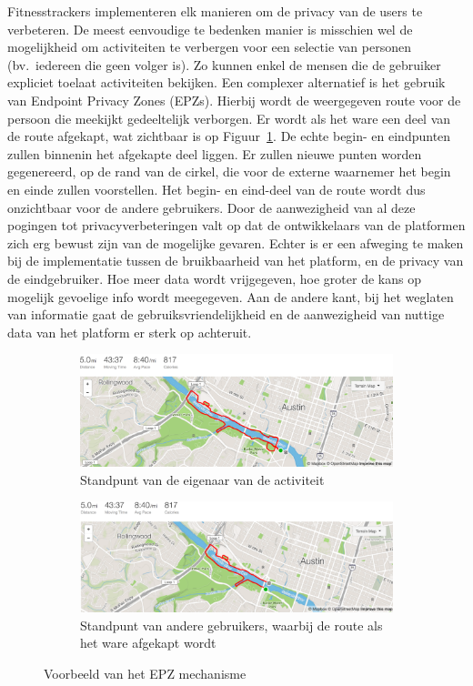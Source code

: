 Fitnesstrackers implementeren elk manieren om de privacy van de users te
verbeteren. De meest eenvoudige te bedenken manier is misschien wel de
mogelijkheid om activiteiten te verbergen voor een selectie van personen (bv.\
iedereen die geen volger is). Zo kunnen enkel de mensen die de gebruiker
expliciet toelaat activiteiten bekijken. Een complexer alternatief is het
gebruik van Endpoint Privacy Zones (\acp{EPZ}). Hierbij wordt de weergegeven
route voor de persoon die meekijkt gedeeltelijk verborgen. Er wordt als het
ware een deel van de route afgekapt, wat zichtbaar is op
Figuur~\ref{fig:example_hassan}. De echte begin- en eindpunten zullen binnenin
het afgekapte deel liggen. Er zullen nieuwe punten worden gegenereerd, op de
rand van de cirkel, die voor de externe waarnemer het begin en einde zullen
voorstellen. Het begin- en eind-deel van de route wordt dus onzichtbaar voor de
andere gebruikers. Door de aanwezigheid van al deze pogingen tot
privacyverbeteringen valt op dat de ontwikkelaars van de platformen zich erg
bewust zijn van de mogelijke gevaren. Echter is er een afweging te maken bij de
implementatie tussen de bruikbaarheid van het platform, en de privacy van de
eindgebruiker. Hoe meer data wordt vrijgegeven, hoe groter de kans op mogelijk
gevoelige info wordt meegegeven. Aan de andere kant, bij het weglaten van
informatie gaat de gebruiksvriendelijkheid en de aanwezigheid van nuttige data
van het platform er sterk op achteruit.
\begin{figure}[h]
    \centering
    \begin{subfigure}[b]{0.8\linewidth}
        \includegraphics[width=\linewidth]{fig/EPZ-mechanisme/Hassan_examle_before.png}
        \caption{Standpunt van de eigenaar van de activiteit}
    \end{subfigure}
    \begin{subfigure}[b]{0.8\linewidth}
        \includegraphics[width=\linewidth]{fig/EPZ-mechanisme/Hassan_examle_after.png}
        \caption{Standpunt van andere gebruikers, waarbij de route als het ware afgekapt wordt}
    \end{subfigure}
    \caption{Voorbeeld van het EPZ mechanisme~\cite{sec18has3:online}}\label{fig:example_hassan}
\end{figure}

